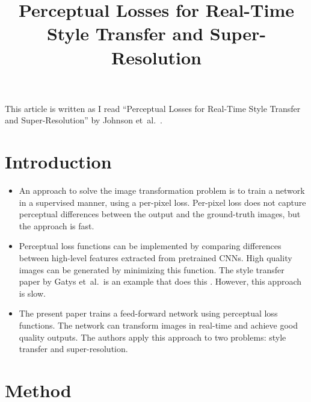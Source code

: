 \documentclass[10pt]{article}
\title{Perceptual Losses for Real-Time Style Transfer and Super-Resolution}
\newcommand{\etal}{{et~al.}}
\begin{document}
  \maketitle

  This article is written as I read ``Perceptual Losses for Real-Time Style Transfer and Super-Resolution'' by Johnson \etal\ \cite{Johnson:2016}.

  \section{Introduction}

  \begin{itemize}
  	\item An approach to solve the image transformation problem is to train a network in a supervised manner, using a per-pixel loss. Per-pixel loss does not capture perceptual differences between the output and the ground-truth images, but the approach is fast.

  	\item Perceptual loss functions can be implemented by comparing differences between high-level features extracted from pretrained CNNs. High quality images can be generated by minimizing this function. The style transfer paper by Gatys \etal\ is an example that does this \cite{Gatys:2015}. However, this approach is slow.

  	\item The present paper trains a feed-forward network using perceptual loss functions. The network can transform images in real-time and achieve good quality outputs. The authors apply this approach to two problems: style transfer and super-resolution.  
  \end{itemize}

  \section{Method}
\end{document}
